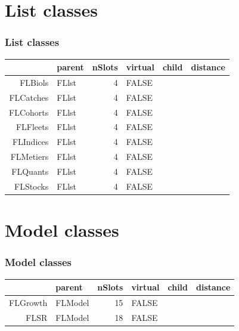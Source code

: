 \documentclass{beamer}%
\begin{document}
\section{List classes}
\begin{frame}[containsverbatim]
  \frametitle{List classes}

\scriptsize{
\begin{table}[ht]
\begin{center}
\begin{tabular}{rlrllr}
  \hline
 & parent & nSlots & virtual & child & distance \\ 
  \hline
FLBiols & FLlst &   4 & FALSE &  &  \\ 
  FLCatches & FLlst &   4 & FALSE &  &  \\ 
  FLCohorts & FLlst &   4 & FALSE &  &  \\ 
  FLFleets & FLlst &   4 & FALSE &  &  \\ 
  FLIndices & FLlst &   4 & FALSE &  &  \\ 
  FLMetiers & FLlst &   4 & FALSE &  &  \\ 
  FLQuants & FLlst &   4 & FALSE &  &  \\ 
  FLStocks & FLlst &   4 & FALSE &  &  \\ 
   \hline
\end{tabular}
\end{center}
\end{table}}

\end{frame}


\section{Model classes}
\begin{frame}[containsverbatim]
  \frametitle{Model classes}

\scriptsize{
\begin{table}[ht]
\begin{center}
\begin{tabular}{rlrllr}
  \hline
 & parent & nSlots & virtual & child & distance \\ 
  \hline
FLGrowth & FLModel &  15 & FALSE &  &  \\ 
  FLSR & FLModel &  18 & FALSE &  &  \\ 
   \hline
\end{tabular}
\end{center}
\end{table}}

\end{frame}
\end{document}
